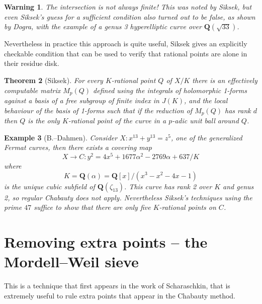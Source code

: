 \documentclass[oneside,11pt,]{article}
\newtheorem{theorem}{Theorem}
\newtheorem{warning}[theorem]{Warning}
\newtheorem{example}[theorem]{Example}
\newcommand{\QQ}{\mathbf{Q}}
\begin{document}
%
\begin{warning}
    The intersection is not always finite! This was noted by Siksek, but even Siksek's guess for a sufficient condition also turned out to be false, as shown by Dogra, with the example of a genus 3 hyperelliptic curve over $\QQ(\sqrt{33})$.
\end{warning}

Nevertheless in practice this approach is quite useful, Siksek gives an explicitly checkable condition that can be used to verify that rational points are alone in their residue disk.

\begin{theorem}[Siksek]
    For every $K$-rational point $Q$ of $X/K$ there is an effectively computable matrix $M_p(Q)$ defined using the integrals of holomorphic 1-forms against a basis of a free subgroup of finite index in $J(K)$, and the local behaviour of the basis of 1-forms such that if the reduction of $M_p(Q)$ has rank $d$ then $Q$ is the only $K$-rational point of the curve in a $p$-adic unit ball around $Q$.
\end{theorem}

\begin{example}[B.--Dahmen]
    Consider \(X\colon  x^{13} + y^{13} = z^5\), one of the generalized Fermat curves, then there exists a covering map
    \[X \to C \colon y^2 = 4 x^5 + 1677 \alpha^2 - 2769 \alpha + 637/K\]
    where
    \[K = \QQ(\alpha ) = \QQ[x]/(x^{3} - x^{2} - 4 x - 1)\]
    is the unique cubic subfield of $\QQ(\zeta _{13})$.
    This curve has rank 2 over $K$ and genus 2, so regular Chabauty does not apply.
    Nevertheless Siksek's techniques using the prime $47$ suffice to show that there are only five $K$-rational points on $C$.
\end{example}


\section{Removing extra points -- the Mordell--Weil sieve}
This is a technique that first appears in the work of Scharaschkin, that is extremely useful to rule extra points that appear in the Chabauty method.
\end{document}
